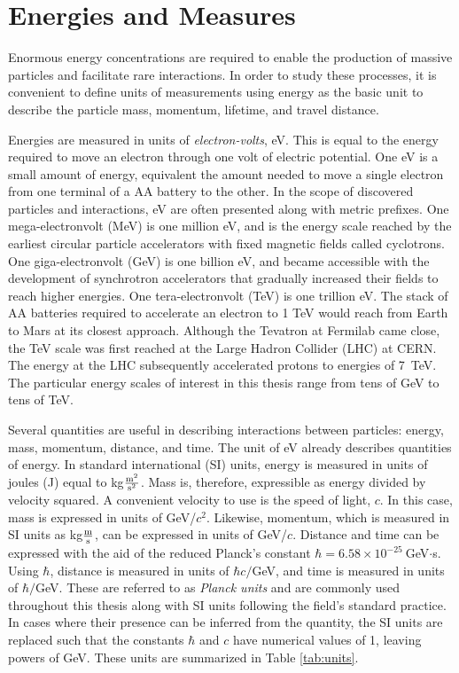 \section{Energies and Measures}

Enormous energy concentrations are required to enable the production of massive particles and facilitate rare interactions.
In order to study these processes, it is convenient to define units of measurements using energy as the basic unit to describe the particle mass, momentum, lifetime, and travel distance.

Energies are measured in units of \emph{electron-volts}, eV.
This is equal to the energy required to move an electron through one volt of electric potential.
One eV is a small amount of energy, equivalent the amount needed to move a single electron from one terminal of a AA battery to the other.
In the scope of discovered particles and interactions, eV are often presented along with metric prefixes.
One mega-electronvolt (MeV) is one million eV, and is the energy scale reached by the earliest circular particle accelerators with fixed magnetic fields called cyclotrons.
One giga-electronvolt (GeV) is one billion eV, and became accessible with the development of synchrotron accelerators that gradually increased their fields to reach higher energies.
One tera-electronvolt (TeV) is one trillion eV.
The stack of AA batteries required to accelerate an electron to 1 TeV would reach from Earth to Mars at its closest approach.
Although the Tevatron at Fermilab came close, the TeV scale was first reached at the Large Hadron Collider (LHC) at CERN.
The energy at the LHC subsequently accelerated protons to energies of 7~TeV.
The particular energy scales of interest in this thesis range from tens of GeV to tens of TeV.

Several quantities are useful in describing interactions between particles: energy, mass, momentum, distance, and time.
The unit of eV already describes quantities of energy.
In standard international (SI) units, energy is measured in units of joules (J) equal to kg$\frac{\text m^2}{\text s^2}$.
Mass is, therefore, expressible as energy divided by velocity squared.
A convenient velocity to use is the speed of light, $c$.
In this case, mass is expressed in units of GeV/$c^2$.
Likewise, momentum, which is measured in SI units as kg$\frac{\text m}{\text s}$, can be expressed in units of GeV/$c$.
Distance and time can be expressed with the aid of the reduced Planck's constant $\hbar=6.58\times10^{-25}~$GeV$\cdot$s.
Using $\hbar$, distance is measured in units of $\hbar c/$GeV, and time is measured in units of $\hbar/$GeV.
These are referred to as \emph{Planck units} and are commonly used throughout this thesis along with SI units following the field's standard practice.
In cases where their presence can be inferred from the quantity, the SI units are replaced such that the constants $\hbar$ and $c$ have numerical values of 1, leaving powers of GeV.
These units are summarized in Table \ref{tab:units}.

